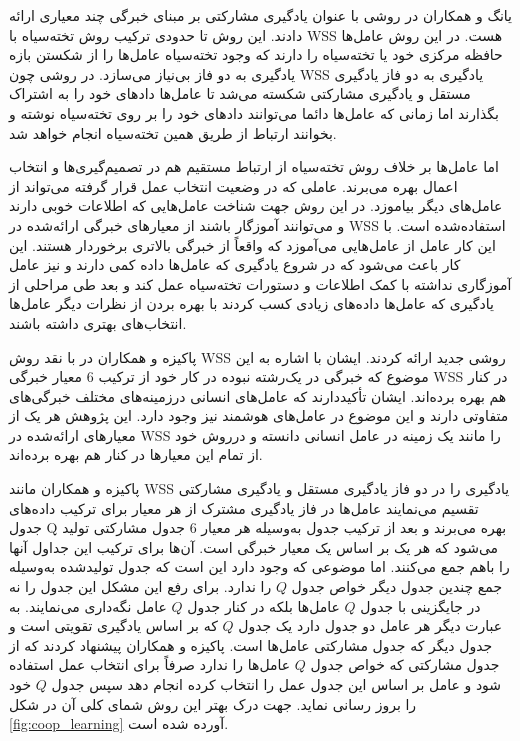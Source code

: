 یانگ و همکاران در  روشی با عنوان یادگیری مشارکتی بر مبنای خبرگی چند معیاری ارائه‌ دادند. این روش تا حدودی ترکیب روش تخته‌سیاه با WSS هست. در این روش عامل‌ها حافظه مرکزی خود یا تخته‌سیاه را دارند که وجود تخته‌سیاه عامل‌ها را از شکستن بازه یادگیری به دو فاز بی‌نیاز می‌سازد. در روشی چون WSS یادگیری به دو فاز یادگیری مستقل و یادگیری مشارکتی شکسته می‌شد تا عامل‌ها دادهای خود را به اشتراک بگذارند اما زمانی که عامل‌ها دائما می‌توانند دادهای خود را بر روی تخته‌سیاه نوشته و بخوانند ارتباط از طریق همین تخته‌سیاه انجام خواهد شد.

اما عامل‌ها بر خلاف روش تخته‌سیاه از ارتباط مستقیم هم در تصمیم‌گیری‌ها و انتخاب اعمال بهره می‌برند. عاملی که در وضعیت انتخاب عمل قرار گرفته می‌تواند از عامل‌های دیگر بیاموزد. در این روش جهت شناخت عامل‌هایی که اطلاعات خوبی دارند و می‌توانند آموزگار باشند از معیارهای خبرگی ارائه‌شده در WSS استفاده‌شده است. با این کار عامل از عامل‌هایی می‌آموزد که واقعاً از خبرگی بالاتری برخوردار هستند. این کار باعث می‌شود که در شروع یادگیری که عامل‌ها داده کمی دارند و نیز عامل آموزگاری نداشته با کمک اطلاعات و دستورات تخته‌سیاه عمل کند و بعد طی مراحلی از یادگیری که عامل‌ها داده‌های زیادی کسب کردند با بهره بردن از نظرات دیگر عامل‌ها انتخاب‌های بهتری داشته باشند.

پاکیزه و همکاران در  با نقد روش WSS روشی جدید ارائه کردند. ایشان با اشاره به این موضوع که خبرگی در یک‌رشته نبوده در کار خود از ترکیب 6 معیار خبرگی WSS در کنار هم بهره برده‌اند. ایشان تأکیددارند که عامل‌های انسانی درزمینه‌های مختلف خبرگی‌های متفاوتی دارند و این موضوع در عامل‌های هوشمند نیز وجود دارد. این پژوهش هر یک از معیارهای ارائه‌شده در WSS را مانند یک زمینه در عامل انسانی دانسته و درروش خود از تمام این معیارها در کنار هم بهره برده‌اند.

پاکیزه و همکاران مانند WSS یادگیری را در دو فاز یادگیری مستقل و یادگیری مشارکتی تقسیم می‌نمایند عامل‌ها در فاز یادگیری مشترک از هر معیار برای ترکیب داده‌های جدول Q بهره می‌برند و بعد از ترکیب جدول به‌وسیله هر معیار 6 جدول مشارکتی تولید می‌شود که هر یک بر اساس یک معیار خبرگی است. آن‌ها برای ترکیب این جداول آنها را باهم جمع می‌کنند. اما موضوعی که وجود دارد این است که جدول تولیدشده به‌وسیله جمع چندین جدول دیگر خواص جدول $Q$ را ندارد. برای رفع این مشکل این جدول را نه در جایگزینی با جدول $Q$ عامل‌ها بلکه در کنار جدول $Q$ عامل نگه‌داری می‌نمایند. به عبارت دیگر هر عامل دو جدول دارد یک جدول $Q$ که بر اساس یادگیری تقویتی است و جدول دیگر که جدول مشارکتی عامل‌ها است. پاکیزه و همکاران پیشنهاد کردند که از جدول مشارکتی که خواص جدول $Q$ عامل‌ها را ندارد صرفاً برای انتخاب عمل استفاده شود و عامل بر اساس این جدول عمل را انتخاب کرده انجام دهد سپس جدول $Q$ خود را بروز رسانی نماید. جهت درک بهتر این روش شمای کلی آن در شکل \ref{fig:coop_learning} آورده شده است.

